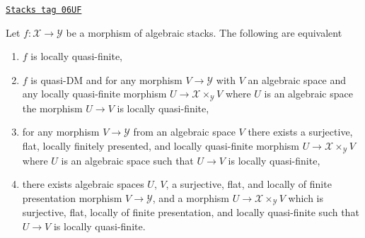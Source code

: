 \begin{lemma}
\label{stacks-morphisms-lemma-characterize-locally-quasi-finite}
\href{https://stacks.math.columbia.edu/tag/06UF}{\texttt{Stacks tag 06UF}}

Let $f : \mathcal{X} \to \mathcal{Y}$ be a morphism of algebraic stacks.
The following are equivalent
\begin{enumerate}
\item $f$ is locally quasi-finite,
\item $f$ is quasi-DM and for any morphism $V \to \mathcal{Y}$ with $V$
an algebraic space and any locally quasi-finite morphism
$U \to \mathcal{X} \times_\mathcal{Y} V$ where $U$ is an algebraic space
the morphism $U \to V$ is locally quasi-finite,
\item for any morphism $V \to \mathcal{Y}$ from an algebraic space $V$
there exists a surjective, flat, locally finitely presented, and locally
quasi-finite morphism $U \to \mathcal{X} \times_\mathcal{Y} V$ where
$U$ is an algebraic space such that $U \to V$ is locally quasi-finite,
\item there exists algebraic spaces $U$, $V$, a surjective, flat,
and locally of finite presentation morphism $V \to \mathcal{Y}$,
and a morphism $U \to \mathcal{X} \times_\mathcal{Y} V$ which
is surjective, flat, locally of finite presentation, and
locally quasi-finite such that $U \to V$ is locally quasi-finite.
\end{enumerate}
\end{lemma}

